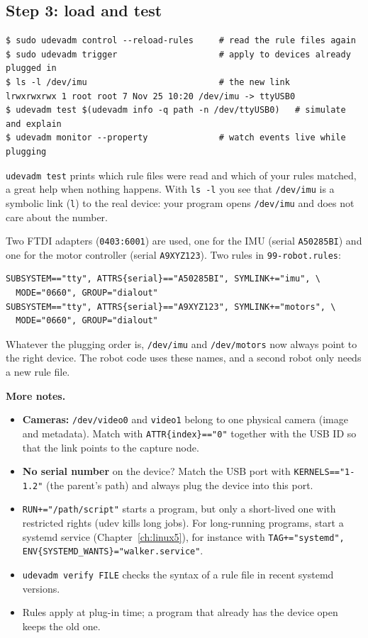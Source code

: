 \subsection*{Step 3: load and test}
\begin{verbatim}
$ sudo udevadm control --reload-rules     # read the rule files again
$ sudo udevadm trigger                    # apply to devices already plugged in
$ ls -l /dev/imu                          # the new link
lrwxrwxrwx 1 root root 7 Nov 25 10:20 /dev/imu -> ttyUSB0
$ udevadm test $(udevadm info -q path -n /dev/ttyUSB0)   # simulate and explain
$ udevadm monitor --property              # watch events live while plugging
\end{verbatim}
\texttt{udevadm test} prints which rule files were read and which of your rules matched, a great help when nothing happens. With \texttt{ls -l} you see that \texttt{/dev/imu} is a symbolic link (\texttt{l}) to the real device: your program opens \texttt{/dev/imu} and does not care about the number.

\begin{example}
Two FTDI adapters (\texttt{0403:6001}) are used, one for the IMU (serial \texttt{A50285BI}) and one for the motor controller (serial \texttt{A9XYZ123}). Two rules in \texttt{99-robot.rules}:
\begin{verbatim}
SUBSYSTEM=="tty", ATTRS{serial}=="A50285BI", SYMLINK+="imu", \
  MODE="0660", GROUP="dialout"
SUBSYSTEM=="tty", ATTRS{serial}=="A9XYZ123", SYMLINK+="motors", \
  MODE="0660", GROUP="dialout"
\end{verbatim}
Whatever the plugging order is, \texttt{/dev/imu} and \texttt{/dev/motors} now always point to the right device. The robot code uses these names, and a second robot only needs a new rule file.
\end{example}

\textbf{More notes.}
\begin{itemize}[nosep]
  \item \textbf{Cameras:} \texttt{/dev/video0} and \texttt{video1} belong to one physical camera (image and metadata). Match with \texttt{ATTR\{index\}=="0"} together with the USB ID so that the link points to the capture node.
  \item \textbf{No serial number} on the device? Match the USB port with \texttt{KERNELS=="1-1.2"} (the parent's path) and always plug the device into this port.
  \item \verb|RUN+="/path/script"| starts a program, but only a short-lived one with restricted rights (udev kills long jobs). For long-running programs, start a systemd service (Chapter~\ref{ch:linux5}), for instance with \texttt{TAG+="systemd", ENV\{SYSTEMD\_WANTS\}="walker.service"}.
  \item \verb|udevadm verify FILE| checks the syntax of a rule file in recent systemd versions.
  \item Rules apply at plug-in time; a program that already has the device open keeps the old one.
\end{itemize}

